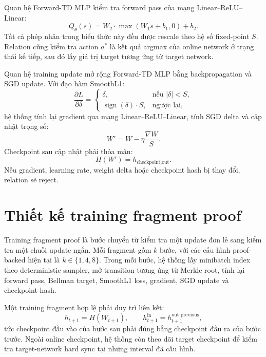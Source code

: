 \documentclass[12pt,a4paper,oneside]{report}
\begin{document}
Quan hệ Forward-TD MLP kiểm tra forward pass của mạng Linear--ReLU--Linear:
\[
Q_\theta(s)=W_2 \cdot \max(W_1s+b_1,0)+b_2.
\]
Tất cả phép nhân trong biểu thức này đều được rescale theo hệ số fixed-point \(S\). Relation cũng kiểm tra action \(a^*\) là kết quả argmax của online network ở trạng thái kế tiếp, sau đó lấy giá trị target tương ứng từ target network.

Quan hệ training update mở rộng Forward-TD MLP bằng backpropagation và SGD update. Với đạo hàm SmoothL1:
\[
\frac{\partial L}{\partial \delta}=
\begin{cases}
\delta, & \text{nếu } |\delta| < S,\\
\operatorname{sign}(\delta)\cdot S, & \text{ngược lại},
\end{cases}
\]
hệ thống tính lại gradient qua mạng Linear--ReLU--Linear, tính SGD delta và cập nhật trọng số:
\[
W' = W - \eta \frac{\nabla W}{S}.
\]
Checkpoint sau cập nhật phải thỏa mãn:
\[
H(W') = h_{\text{checkpoint,out}}.
\]
Nếu gradient, learning rate, weight delta hoặc checkpoint hash bị thay đổi, relation sẽ reject.

\section{Thiết kế training fragment proof}

Training fragment proof là bước chuyển từ kiểm tra một update đơn lẻ sang kiểm tra một chuỗi update ngắn. Mỗi fragment gồm \(k\) bước, với các cấu hình proof-backed hiện tại là \(k \in \{1,4,8\}\). Trong mỗi bước, hệ thống lấy minibatch index theo deterministic sampler, mở transition tương ứng từ Merkle root, tính lại forward pass, Bellman target, SmoothL1 loss, gradient, SGD update và checkpoint hash.

Một training fragment hợp lệ phải duy trì liên kết:
\[
h_{t+1}=H(W_{t+1}),
\qquad
h_{t+1}^{\text{in}} = h_{t+1}^{\text{out previous}},
\]
tức checkpoint đầu vào của bước sau phải đúng bằng checkpoint đầu ra của bước trước. Ngoài online checkpoint, hệ thống còn theo dõi target checkpoint để kiểm tra target-network hard sync tại những interval đã cấu hình.
\end{document}
